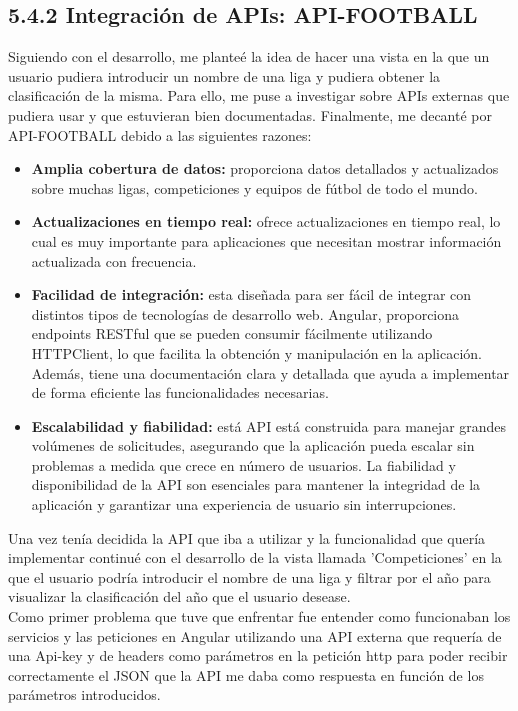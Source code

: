 \subsection{5.4.2 Integración de APIs: API-FOOTBALL}
Siguiendo con el desarrollo, me planteé la idea de hacer una vista en la que un usuario pudiera introducir un nombre de una liga y pudiera obtener la clasificación de la misma. Para ello, me puse a investigar sobre APIs externas que pudiera usar y que estuvieran bien documentadas. Finalmente, me decanté por API-FOOTBALL \cite{api:web} debido a las siguientes razones:
\begin{itemize}
    \item \textbf{Amplia cobertura de datos:} proporciona datos detallados y actualizados sobre muchas ligas, competiciones y equipos de fútbol de todo el mundo.
    \item \textbf{Actualizaciones en tiempo real:} ofrece actualizaciones en tiempo real, lo cual es muy importante para aplicaciones que necesitan mostrar información actualizada con frecuencia.
    \item \textbf{Facilidad de integración:} esta diseñada para ser fácil de integrar con distintos tipos de tecnologías de desarrollo web. Angular, proporciona endpoints RESTful que se pueden consumir fácilmente utilizando HTTPClient, lo que facilita la obtención y manipulación en la aplicación. Además, tiene una documentación clara y detallada que ayuda a implementar de forma eficiente las funcionalidades necesarias.
    \item \textbf{Escalabilidad y fiabilidad:} está API está construida para manejar grandes volúmenes de solicitudes, asegurando que la aplicación pueda escalar sin problemas a medida que crece en número de usuarios. La fiabilidad y disponibilidad de la API son esenciales para mantener la integridad de la aplicación y garantizar una experiencia de usuario sin interrupciones.
\end{itemize}
Una vez tenía decidida la API que iba a utilizar y la funcionalidad que quería implementar continué con el desarrollo de la vista llamada 'Competiciones' en la que el usuario podría introducir el nombre de una liga y filtrar por el año para visualizar la clasificación del año que el usuario desease. \\
Como primer problema que tuve que enfrentar fue entender como funcionaban los servicios y las peticiones en Angular utilizando una API externa que requería de una Api-key y de headers como parámetros en la petición http para poder recibir correctamente el JSON que la API me daba como respuesta en función de los parámetros introducidos. \\
